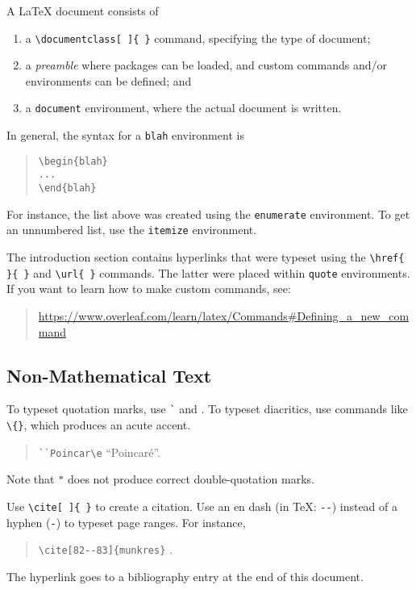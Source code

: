 \documentclass[a4paper,10pt,leqno]{article}
\numberwithin{equation}{section}
\theoremstyle{plain}
\theoremstyle{definition}
\theoremstyle{remark}
\begin{document}
A \LaTeX{} document consists of
\begin{enumerate} 
\item 	a \verb|\documentclass[ ]{ }| command, specifying the type of document; 

\item 	a \emph{preamble} where packages can be loaded, and custom commands and/or environments can be defined; and

\item 	a \texttt{document} environment, where the actual document is written.

\end{enumerate}
In general, the syntax for a \texttt{blah} environment is
\begin{quote}
\verb|\begin{blah}|\\
\verb|...|\\
\verb|\end{blah}|
\end{quote}
For instance, the list above was created using the \texttt{enumerate} environment.
To get an unnumbered list, use the \texttt{itemize} environment.

The introduction section contains hyperlinks that were typeset using the \verb|\href{ }{ }| and \verb|\url{ }| commands.
The latter were placed within \texttt{quote} environments.
If you want to learn how to make custom commands, see:
\begin{quote}
\url{https://www.overleaf.com/learn/latex/Commands#Defining_a_new_command}
\end{quote}

\subsection{Non-Mathematical Text}
 
To typeset quotation marks, use \texttt{\`{}} and \texttt{\textquotesingle}.
To typeset diacritics, use commands like \texttt{\textbackslash\textquotesingle\{\}}, which produces an acute accent.
\begin{quote}
\texttt{\`{}\`{}Poincar\textbackslash\textquotesingle{}e\textquotesingle\textquotesingle{}}
\quad
``Poincar\'e''.
\end{quote}
Note that \texttt{"} does not produce correct double-quotation marks.

Use \texttt{\textbackslash{}cite[ ]\{ \}} to create a citation.
Use an en dash (in \TeX: \texttt{-{}-}) instead of a hyphen (\texttt{-}) to typeset page ranges.
For instance,
\begin{quote}
\verb|\cite[82--83]{munkres}|
\quad
\cite[82--83]{munkres}.
\end{quote}
The hyperlink goes to a bibliography entry at the end of this document.
\end{document}
